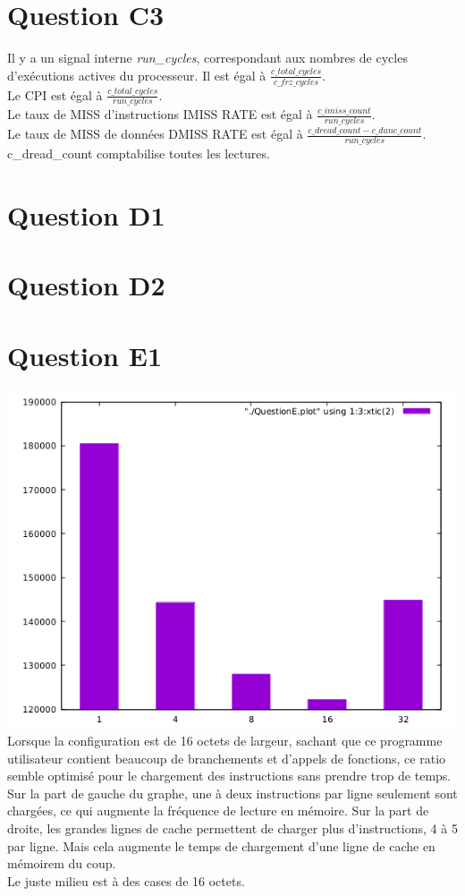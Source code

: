 \documentclass[10pt]{article}
\begin{document}
\section{Question C3}
Il y a un signal interne {\it run\_cycles}, correspondant aux nombres de cycles
d'exécutions actives du processeur. Il est égal à
$\frac{c\_total\_cycles}{c\_frz\_cycles}$.\\
Le CPI est égal à $\frac{c\_total\_cycles}{run\_cycles}$.\\
Le taux de MISS d'instructions IMISS RATE est égal à
$\frac{c\_imiss\_count}{run\_cycles}$.\\
Le taux de MISS de données DMISS RATE est égal à
$\frac{{c\_dread\_count}-{c\_dunc\_count}}{run\_cycles}$.\\
c\_dread\_count comptabilise toutes les lectures.

\section{Question D1}

\section{Question D2}

\newpage

\section{Question E1}
\includegraphics[width=18cm]{QuestionE.png}\\
Lorsque la configuration est de 16 octets de largeur, sachant que ce programme
utilisateur contient beaucoup de branchements et d'appels de fonctions, ce
ratio semble optimisé pour le chargement des instructions sans prendre trop de
temps. Sur la part de gauche du graphe, une à deux instructions par ligne
seulement sont chargées, ce qui augmente la fréquence de lecture en mémoire.
Sur la part de droite, les grandes lignes de cache permettent de charger plus
d'instructions, 4 à 5 par ligne. Mais cela augmente le temps de chargement d'une
ligne de cache en mémoirem du coup.\\
Le juste milieu est à des cases de 16 octets.
\end{document}
